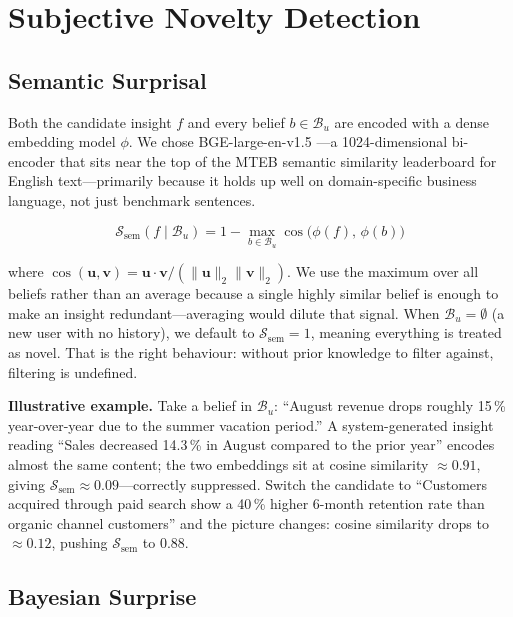 \documentclass[conference]{IEEEtran}
\begin{document}
\section{Subjective Novelty Detection}
\label{sec:snd}

\subsection{Semantic Surprisal}

Both the candidate insight $f$ and every belief $b \in \mathcal{B}_u$
are encoded with a dense embedding model $\phi$. We chose
BGE-large-en-v1.5 \cite{xiao2023bge}---a 1024-dimensional bi-encoder
that sits near the top of the MTEB semantic similarity leaderboard
\cite{muennighoff2023mteb} for English text---primarily because it
holds up well on domain-specific business language, not just
benchmark sentences.

\begin{equation}
  \mathcal{S}_{\text{sem}}(f \mid \mathcal{B}_u)
    = 1 - \max_{b \in \mathcal{B}_u} \cos\!\bigl(\phi(f),\, \phi(b)\bigr)
  \label{eq:semantic}
\end{equation}

where $\cos(\mathbf{u}, \mathbf{v}) = {\mathbf{u} \cdot \mathbf{v}} /
{(\|\mathbf{u}\|_2 \|\mathbf{v}\|_2)}$. We use the maximum over all
beliefs rather than an average because a single highly similar belief
is enough to make an insight redundant---averaging would dilute that
signal. When $\mathcal{B}_u = \emptyset$ (a new user with no history),
we default to $\mathcal{S}_{\text{sem}} = 1$, meaning everything is
treated as novel. That is the right behaviour: without prior knowledge
to filter against, filtering is undefined.

\textbf{Illustrative example.} Take a belief in $\mathcal{B}_u$:
``August revenue drops roughly 15\,\% year-over-year due to the summer
vacation period.'' A system-generated insight reading ``Sales decreased
14.3\,\% in August compared to the prior year'' encodes almost the
same content; the two embeddings sit at cosine similarity $\approx 0.91$,
giving $\mathcal{S}_{\text{sem}} \approx 0.09$---correctly suppressed.
Switch the candidate to ``Customers acquired through paid search show
a 40\,\% higher 6-month retention rate than organic channel customers''
and the picture changes: cosine similarity drops to $\approx 0.12$,
pushing $\mathcal{S}_{\text{sem}}$ to 0.88.

\subsection{Bayesian Surprise}
\label{sec:bayes}
\end{document}
